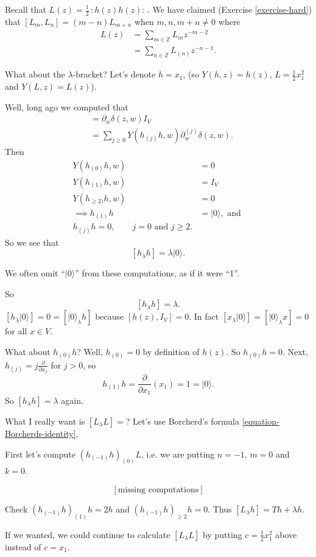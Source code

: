 \begin{example}
Recall that $L(z)=\frac{1}{2} \,:\!h(z)h(z)\!:\,$. We have claimed
(Exercise \ref{exercise-hard})
that $[L_m,L_n]=(m-n)L_{m+n}$ when $m,n,m+n \neq 0$
where
\begin{align*}
L(z)&=\sum_{m \in \mathbb{Z}}L_mz^{-m-2}\\
&=\sum_{n \in \mathbb{Z}}L_{(n)}z^{-n-1}.
\end{align*}

\medskip\noindent
What about the $\lambda$-bracket? Let's denote
$h=x_1$, (so $Y(h,z)=h(z)$, $L=\frac{1}{2}x_1^2$
and $Y(L,z)=L(z)$).

Well, long ago we computed that
\begin{align*}
[h(z),h(w)]&=\partial_w \delta(z,w)I_V\\
&=\sum_{j \geq 0}Y(h_{(j)}h,w)\partial_w^{(j)}\delta(z,w).
\end{align*}
Then
\begin{align*}
Y(h_{(0)}h,w)&=0\\
Y(h_{(1)}h,w)&=I_V\\
Y(h_{\geq 2)}h,w)&=0\\
\implies h_{(1)}h&=|0\rangle, \text{ and }\\
h_{(j)}h=0,\qquad j=0\text{ and }j\geq 2.
\end{align*}
So we see that
$$
[h_\lambda h]=\lambda |0\rangle.
$$

We often omit  ``$|0\rangle$'' from these computations,
as if it were ``1''.

So
$$
[h_\lambda h]=\lambda.
$$
\medskip\noindent
$[h_\lambda |0\rangle]=0=[|0\rangle_\lambda h]$ 
because $[h(z),I_V]=0$.
In fact $[x_\lambda |0\rangle]=[|0\rangle_\lambda x]=0$ for all $x \in V$.

\medskip\noindent
What about $h_{(0)}h$? Well, $h_{(0)}=0$ by definition of $h(z)$.
So $h_{(0)}h=0$. Next, $h_{(j)}=j\frac{\partial }{\partial x_j}$ for
$j>0$, so
$$
h_{(1)}h= \frac{\partial }{\partial x_1}(x_1)=1=|0\rangle.
$$
So $[h_\lambda h]=\lambda$ again.

What I really want is $[L_\lambda L]=$? Let's use
Borcherd's formula \ref{equation-Borcherds-identity}.

First let's compute $(h_{(-1)}h)_{(0)}L$, i.e. we
are putting $n=-1$, $m=0$ and $k=0$.

$$
[\text{missing computations}]
$$
\begin{exercise}
\label{exercise-conta}
Check $(h_{(-1)}h)_{(1)}h=2h$ and
$(h_{(-1)}h)_{\geq 2}h=0$.
Thus $[L_\lambda h]=Th+\lambda h$.
\end{exercise}
If we wanted, we could continue to calculate
$[L_\lambda L]$ by putting $c=\frac{1}{2}x_1^2$ above
instead of $c=x_1$.


\end{example}
